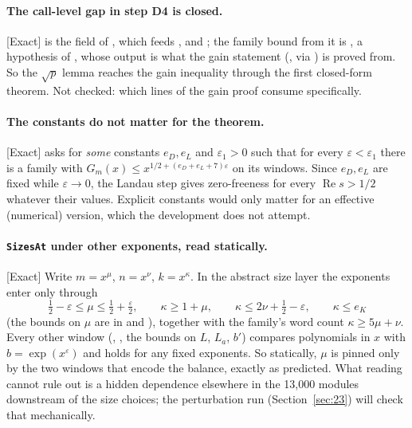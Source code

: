 \documentclass[11pt]{article}
\newcommand{\Exact}{\textcolor{exactc}{\textsf{\small[Exact]}}}
\newcommand{\eps}{\varepsilon}
\newcommand{\re}{\operatorname{Re}}
\theoremstyle{plain}
\theoremstyle{definition}
\begin{document}
\paragraph{The call-level gap in step D4 is closed.} \Exact{}  is the
field  of , which feeds ,
 and ; the family bound
from it is , a hypothesis of , whose output is what the
gain statement (, via ) is proved from. So the $\sqrt p$
lemma reaches the gain inequality through the first closed-form theorem. Not checked: which lines of
the gain proof consume  specifically.

\paragraph{The constants do not matter for the theorem.} \Exact{}
 asks for \emph{some} constants $e_D,e_L$ and $\eps_1>0$
such that for every $\eps<\eps_1$ there is a family with $G_m(x)\le x^{1/2+(e_D+e_L+7)\eps}$ on its
windows. Since $e_D,e_L$ are fixed while $\eps\to0$, the Landau step gives zero-freeness for every
$\re s>1/2$ whatever their values. Explicit constants would only matter for an effective
(numerical) version, which the development does not attempt.

\paragraph{\texttt{SizesAt} under other exponents, read statically.} \Exact{} Write $m=x^\mu$,
$n=x^\nu$, $k=x^\kappa$. In the abstract size layer the exponents enter only through
\[
\tfrac12-\eps\le\mu\le\tfrac12+\tfrac\eps2,\qquad
\kappa\ge1+\mu,\qquad \kappa\le 2\nu+\tfrac12-\eps,\qquad \kappa\le e_K
\]
(the bounds on $\mu$ are in  and ), together with the family's word count $\kappa\ge5\mu+\nu$. Every other window
(, , the bounds on $L$, $L_a$, $b'$) compares
polynomials in $x$ with $b=\exp(x^\eps)$ and holds for any fixed exponents. So statically, $\mu$ is
pinned only by the two windows that encode the balance, exactly as predicted. What reading cannot
rule out is a hidden dependence elsewhere in the 13{,}000 modules downstream of the size choices;
the perturbation run (Section~\ref{sec:23}) will check that mechanically.
\end{document}
